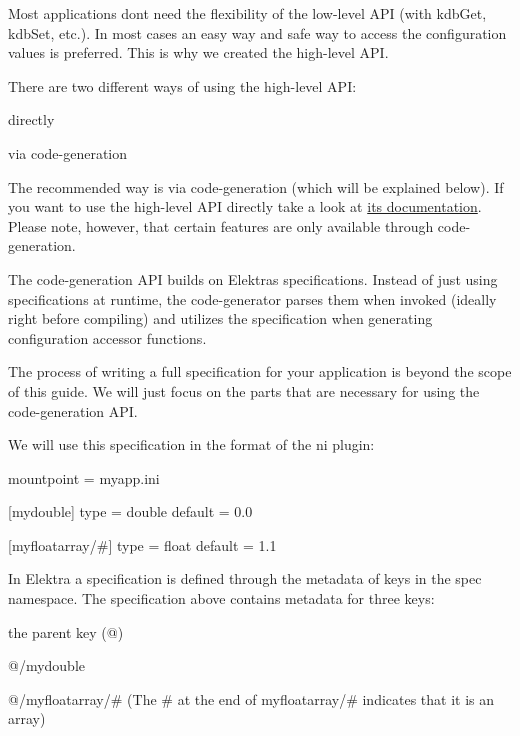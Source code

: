 Most applications don\textquotesingle{}t need the flexibility of the low-\/level A\+PI (with {\ttfamily kdb\+Get}, {\ttfamily kdb\+Set}, etc.). In most cases an easy way and safe way to access the configuration values is preferred. This is why we created the high-\/level A\+PI.

There are two different ways of using the high-\/level A\+PI\+:


\begin{DoxyEnumerate}
\item directly
\item via code-\/generation
\end{DoxyEnumerate}

The recommended way is via code-\/generation (which will be explained below). If you want to use the high-\/level A\+PI directly take a look at \hyperlink{src_libs_highlevel_README_md}{its documentation}. Please note, however, that certain features are only available through code-\/generation.

The code-\/generation A\+PI builds on Elektra\textquotesingle{}s specifications. Instead of just using specifications at runtime, the code-\/generator parses them when invoked (ideally right before compiling) and utilizes the specification when generating configuration accessor functions.

The process of writing a full specification for your application is beyond the scope of this guide. We will just focus on the parts that are necessary for using the code-\/generation A\+PI.

We will use this specification in the format of the {\ttfamily ni} plugin\+:


\begin{DoxyCode}
[]
mountpoint = myapp.ini

[mydouble]
type = double
default = 0.0

[myfloatarray/#]
type = float
default = 1.1
\end{DoxyCode}


In Elektra a specification is defined through the metadata of keys in the {\ttfamily spec} namespace. The specification above contains metadata for three keys\+:


\begin{DoxyEnumerate}
\item the parent key ({\ttfamily @})
\item {\ttfamily @/mydouble}
\item {\ttfamily @/myfloatarray/\#} (The {\ttfamily \#} at the end of {\ttfamily myfloatarray/\#} indicates that it is an array)
\end{DoxyEnumerate}

